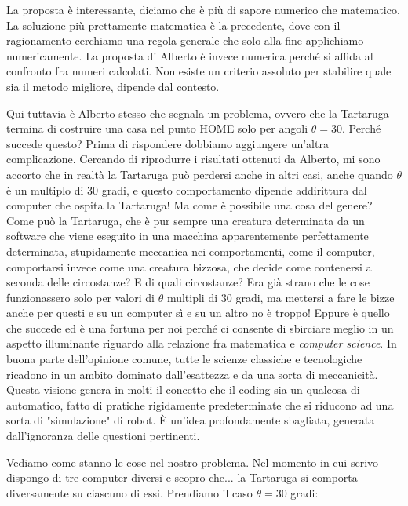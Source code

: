 La proposta è interessante, diciamo che è più di sapore numerico che
matematico. La soluzione più prettamente matematica è la precedente, dove con
il ragionamento cerchiamo una regola generale che solo alla fine applichiamo
numericamente. La proposta di Alberto è invece numerica perché si affida al
confronto fra numeri calcolati. Non esiste un criterio assoluto per stabilire
quale sia il metodo migliore, dipende dal contesto.

Qui tuttavia è Alberto stesso che segnala un problema, ovvero che la Tartaruga
termina di costruire una casa nel punto HOME solo per angoli $\theta = 30$.
Perché succede questo? Prima di rispondere dobbiamo aggiungere un'altra
complicazione. Cercando di riprodurre i risultati ottenuti da Alberto, mi sono
accorto che in realtà la Tartaruga può perdersi anche in altri casi, anche quando
$\theta$ è un multiplo di 30 gradi, e questo comportamento dipende addirittura
dal computer che ospita la Tartaruga! Ma come è possibile una cosa del genere?
Come può la Tartaruga, che è pur sempre una creatura determinata da un software
che viene eseguito in una macchina apparentemente perfettamente determinata,
stupidamente meccanica nei comportamenti, come il computer, comportarsi invece
come una creatura bizzosa, che decide come contenersi a seconda delle
circostanze? E di quali circostanze? Era già strano che le cose funzionassero
solo per valori di $\theta$ multipli di 30 gradi, ma mettersi a fare le bizze
anche per questi e su un computer sì e su un altro no è troppo! Eppure è quello
che succede ed è una fortuna per noi perché ci consente di sbirciare meglio in
un aspetto illuminante riguardo alla relazione fra matematica e \textit{computer
science}. In buona parte dell'opinione comune, tutte le scienze classiche e
tecnologiche ricadono in un ambito dominato dall'esattezza e da una sorta di
meccanicità. Questa visione genera in molti il concetto che il coding sia un
qualcosa di automatico, fatto di pratiche rigidamente predeterminate che si
riducono ad una sorta di "simulazione" di robot. È un'idea profondamente
sbagliata, generata dall'ignoranza delle questioni pertinenti.

Vediamo come stanno le cose nel nostro problema. Nel momento in cui scrivo
dispongo di tre computer diversi e scopro che... la Tartaruga si comporta
diversamente su ciascuno di essi. Prendiamo il caso $\theta=30$ gradi:

